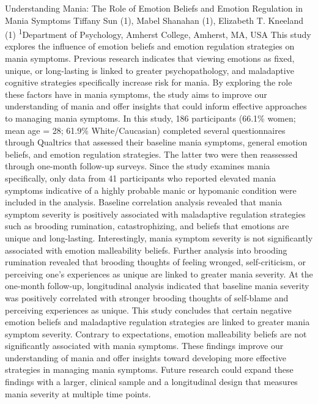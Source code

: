 \makeabstract
{
Understanding Mania: The Role of Emotion Beliefs and Emotion Regulation in Mania Symptoms​
}
{
Tiffany Sun (1), Mabel Shanahan (1), Elizabeth T. Kneeland (1)
}
{
\textsuperscript{1}Department of Psychology, Amherst College, Amherst, MA, USA
}
{
This study explores the influence of emotion beliefs and emotion regulation strategies on mania symptoms. Previous research indicates that viewing emotions as fixed, unique, or long-lasting is linked to greater psychopathology, and maladaptive cognitive strategies specifically increase risk for mania. By exploring the role these factors have in mania symptoms, the study aims to improve our understanding of mania and offer insights that could inform effective approaches to managing mania symptoms.
}
{
In this study, 186 participants (66.1\% women; mean age = 28; 61.9\% White/Caucasian) completed several questionnaires through Qualtrics that assessed their baseline mania symptoms, general emotion beliefs, and emotion regulation strategies. The latter two were then reassessed through one-month follow-up surveys. Since the study examines mania specifically, only data from 41 participants who reported elevated mania symptoms indicative of a highly probable manic or hypomanic condition were included in the analysis. 
}
{
Baseline correlation analysis revealed that mania symptom severity is positively associated with maladaptive regulation strategies such as brooding rumination, catastrophizing, and beliefs that emotions are unique and long-lasting. Interestingly, mania symptom severity is not significantly associated with emotion malleability beliefs. Further analysis into brooding rumination revealed that brooding thoughts of feeling wronged, self-criticism, or perceiving one’s experiences as unique are linked to greater mania severity. At the one-month follow-up, longitudinal analysis indicated that baseline mania severity was positively correlated with stronger brooding thoughts of self-blame and perceiving experiences as unique.
}
{
This study concludes that certain negative emotion beliefs and maladaptive regulation strategies are linked to greater mania symptom severity. Contrary to expectations, emotion malleability beliefs are not significantly associated with mania symptoms. These findings improve our understanding of mania and offer insights toward developing more effective strategies in managing mania symptoms. Future research could expand these findings with a larger, clinical sample and a longitudinal design that measures mania severity at multiple time points.
}

\newpage
